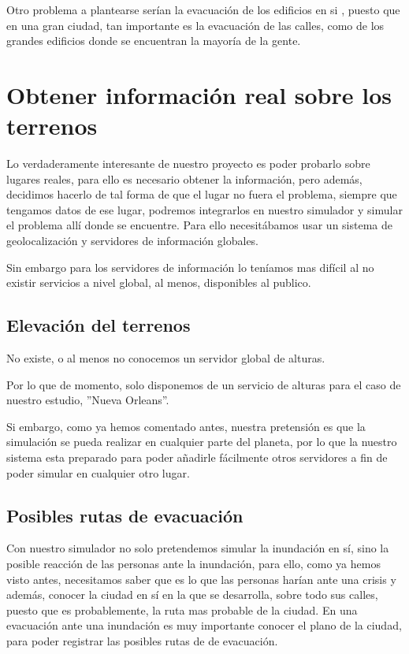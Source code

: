 Otro problema a plantearse serían la evacuación de los edificios en si
\cite{kyoto}, puesto que en una gran ciudad, tan importante es la evacuación de
las calles, como de los grandes edificios donde se encuentran la mayoría de la
gente.
 

\section*{Obtener información real sobre los terrenos}

Lo verdaderamente interesante de nuestro proyecto es poder probarlo sobre
lugares reales, para ello es necesario obtener la información, pero además,
decidimos hacerlo de tal forma de que el lugar no fuera el problema, siempre que
tengamos datos de ese lugar, podremos integrarlos en nuestro simulador y simular
el problema allí donde se encuentre. Para ello necesitábamos usar un sistema de
geolocalización y servidores de información globales.

Sin embargo para los servidores de información lo teníamos mas difícil al no
existir servicios a nivel global, al menos, disponibles al publico.

\subsection*{Elevación del terrenos}

No existe, o al menos no conocemos un servidor global de alturas.

Por lo que de momento, solo disponemos de un servicio de alturas para el caso de
nuestro estudio, ''Nueva Orleans''.

Si embargo, como ya hemos comentado antes, nuestra pretensión es que la
simulación se pueda realizar en cualquier parte del planeta, por lo que la
nuestro sistema esta preparado para poder añadirle fácilmente otros servidores a
fin de poder simular en cualquier otro lugar. 

\subsection*{Posibles rutas de evacuación}

Con nuestro simulador no solo pretendemos simular la inundación en sí, sino la
posible reacción de las personas ante la inundación, para ello, como ya hemos
visto antes, necesitamos saber que es lo que las personas harían ante una
crisis y además, conocer la ciudad en sí en la que se desarrolla, sobre todo sus
calles, puesto que es probablemente, la ruta mas probable de la ciudad.
En una evacuación ante una inundación es muy importante conocer el plano de la
ciudad, para poder registrar las posibles rutas de de evacuación.


